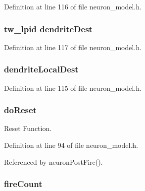 Definition at line 116 of file neuron\+\_\+model.\+h.

\hypertarget{structneuron_state_a081d21dd7333cf48eaec21f5eaef8847}{}
\subsubsection[{dendrite\+Dest}]{\setlength{\rightskip}{0pt plus 5cm}tw\+\_\+lpid dendrite\+Dest}\label{structneuron_state_a081d21dd7333cf48eaec21f5eaef8847}


Definition at line 117 of file neuron\+\_\+model.\+h.

\hypertarget{structneuron_state_af66b578d3c4aac7db55b573b880db0eb}{}
\subsubsection[{dendrite\+Local\+Dest}]{ dendrite\+Local\+Dest}\label{structneuron_state_af66b578d3c4aac7db55b573b880db0eb}


Definition at line 115 of file neuron\+\_\+model.\+h.

\hypertarget{structneuron_state_afcf9d931e4fda519c43b4efeab687463}{}
\subsubsection[{do\+Reset}]{ do\+Reset}\label{structneuron_state_afcf9d931e4fda519c43b4efeab687463}


Reset Function. 



Definition at line 94 of file neuron\+\_\+model.\+h.



Referenced by neuron\+Post\+Fire().

\hypertarget{structneuron_state_afc17c439bc3ffa469b045a7ceff7a25a}{}
\subsubsection[{fire\+Count}]{ fire\+Count}\label{structneuron_state_afc17c439bc3ffa469b045a7ceff7a25a}


